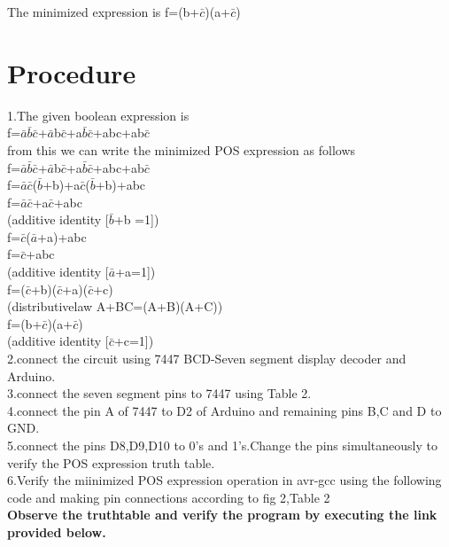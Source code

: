 \documentclass[journal,12pt,twocolumn]{IEEEtran}
\begin{document}
The minimized expression is f=(b+$\bar{c}$)(a+$\bar{c}$)


\section{\textbf{Procedure}}
1.The given boolean expression is 
\\f=$\bar{a}$$\bar{b}$$\bar{c}$+$\bar{a}$b$\bar{c}$+a$\bar{b}$$\bar{c}$+abc+ab$\bar{c}$\\from this we can write the minimized POS expression as follows\\
f=$\bar{a}$$\bar{b}$$\bar{c}$+$\bar{a}$b$\bar{c}$+a$\bar{b}$$\bar{c}$+abc+ab$\bar{c}$\\
f=$\bar{a}$$\bar{c}$($\bar{b}$+b)+a$\bar{c}$($\bar{b}$+b)+abc\\
f=$\bar{a}$$\bar{c}$+a$\bar{c}$+abc		\\(additive identity [$\bar{b}$+b =1])\\
f=$\bar{c}$($\bar{a}$+a)+abc\\
f=$\bar{c}$+abc \\(additive identity [$\bar{a}$+a=1])\\
f=($\bar{c}$+b)($\bar{c}$+a)($\bar{c}$+c)\\(distributivelaw A+BC=(A+B)(A+C))\\
f=(b+$\bar{c}$)(a+$\bar{c}$) \\(additive identity [$\bar{c}$+c=1])\\
2.connect the circuit using 7447 BCD-Seven segment display decoder and Arduino.\\
3.connect the seven segment pins to 7447 using Table 2.\\
4.connect the pin A of 7447 to D2 of Arduino and remaining pins B,C and D to GND.\\ 
5.connect the pins D8,D9,D10 to 0's and 1's.Change the pins simultaneously to verify the POS expression truth table.\\
6.Verify the miinimized POS expression operation in avr-gcc using the following code and making pin connections according to fig 2,Table 2\\

\textbf{Observe the truthtable and verify the program by executing the link provided below.}\\
\begin{center}
\end{center}
\end{document}
